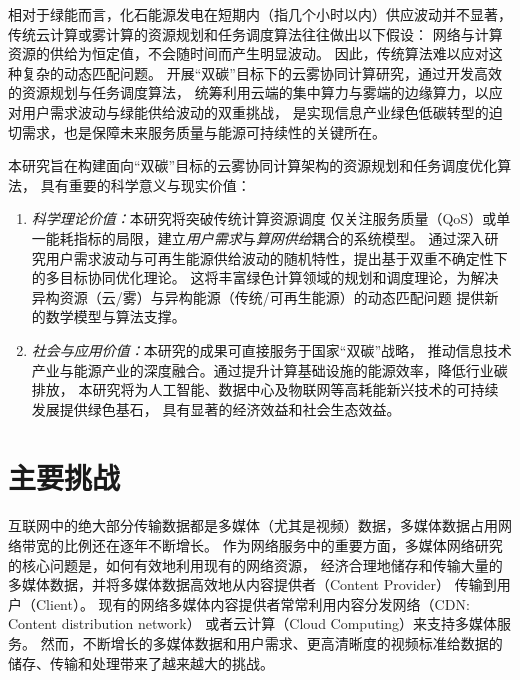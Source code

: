 相对于绿能而言，化石能源发电在短期内（指几个小时以内）供应波动并不显著，
传统云计算或雾计算的资源规划和任务调度算法往往做出以下假设：
网络与计算资源的供给为恒定值，不会随时间而产生明显波动。
因此，传统算法难以应对这种复杂的动态匹配问题。
开展“双碳”目标下的云雾协同计算研究，通过开发高效的资源规划与任务调度算法，
统筹利用云端的集中算力与雾端的边缘算力，以应对用户需求波动与绿能供给波动的双重挑战，
是实现信息产业绿色低碳转型的迫切需求，也是保障未来服务质量与能源可持续性的关键所在。

本研究旨在构建面向“双碳”目标的云雾协同计算架构的资源规划和任务调度优化算法，
具有重要的科学意义与现实价值：
\begin{enumerate}
\item \emph{科学理论价值：}本研究将突破传统计算资源调度
仅关注服务质量（QoS）或单一能耗指标的局限，建立\emph{用户需求}与\emph{算网供给}耦合的系统模型。
通过深入研究用户需求波动与可再生能源供给波动的随机特性，提出基于双重不确定性下的多目标协同优化理论。
这将丰富绿色计算领域的规划和调度理论，为解决异构资源（云/雾）与异构能源（传统/可再生能源）的动态匹配问题
提供新的数学模型与算法支撑。

\item \emph{社会与应用价值：}本研究的成果可直接服务于国家“双碳”战略，
推动信息技术产业与能源产业的深度融合。通过提升计算基础设施的能源效率，降低行业碳排放，
本研究将为人工智能、数据中心及物联网等高耗能新兴技术的可持续发展提供绿色基石，
具有显著的经济效益和社会生态效益。
\end{enumerate}

\section{主要挑战}

互联网中的绝大部分传输数据都是多媒体（尤其是视频）数据，多媒体数据占用网络带宽的比例还在逐年不断增长。
作为网络服务中的重要方面，多媒体网络研究的核心问题是，如何有效地利用现有的网络资源，
经济合理地储存和传输大量的多媒体数据，并将多媒体数据高效地从内容提供者（Content Provider）
传输到用户（Client）。
现有的网络多媒体内容提供者常常利用内容分发网络（CDN: Content distribution network）
或者云计算（Cloud Computing）来支持多媒体服务。
然而，不断增长的多媒体数据和用户需求、更高清晰度的视频标准给数据的储存、传输和处理带来了越来越大的挑战。


